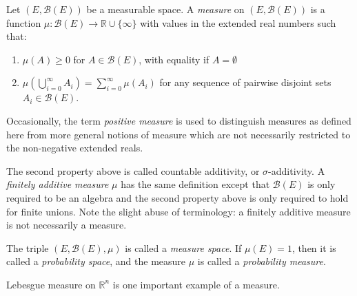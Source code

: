 \documentclass{article}
\newcommand{\union}{\cup}
\begin{document}
Let $(E, \mathcal{B}(E))$ be a measurable space. A \emph{measure} on $(E,\mathcal{B}(E))$ is a function $\mu\colon \mathcal{B}(E) \to \mathbb{R} \union \{\infty\}$ with values in the extended real numbers such that:
\begin{enumerate}
\item $\mu(A) \geq 0$ for $A \in \mathcal{B}(E)$, with equality if $A = \emptyset$
\item $\mu(\bigcup_{i=0}^\infty A_i) = \sum_{i=0}^\infty \mu(A_i)$ for any sequence of pairwise disjoint sets $A_i \in \mathcal{B}(E)$.
\end{enumerate}

Occasionally, the term \emph{positive measure} is used to distinguish measures as defined here from more general notions of measure which are not necessarily restricted to the non-negative extended reals.

The second property above is called countable additivity, or $\sigma$-additivity.  A \emph{finitely additive measure} $\mu$ has the same definition except that $\mathcal{B}(E)$ is only required to be an algebra and the second property above is only required to hold for finite unions.  Note the slight abuse of terminology: a finitely additive measure is not necessarily a measure.

The triple $(E, \mathcal{B}(E), \mu)$ is called a \emph{measure space}. If $\mu(E) = 1$, then it is called a \emph{probability space}, and the measure $\mu$ is called a \emph{probability measure}.

Lebesgue measure on $\mathbb{R}^n$ is one important example of a measure.
\end{document}
